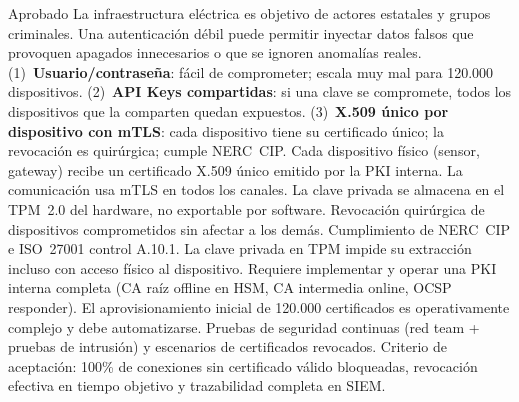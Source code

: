 \documentclass[12pt, letterpaper]{article}
\begin{document}
  {Aprobado}
  {La infraestructura eléctrica es objetivo de actores estatales y grupos criminales.
   Una autenticación débil puede permitir inyectar datos falsos que provoquen apagados
   innecesarios o que se ignoren anomalías reales.}
  {(1)~\textbf{Usuario/contraseña}: fácil de comprometer; escala muy mal para 120.000
   dispositivos.
   (2)~\textbf{API Keys compartidas}: si una clave se compromete, todos los dispositivos
   que la comparten quedan expuestos.
   (3)~\textbf{X.509 único por dispositivo con mTLS}: cada dispositivo tiene su
   certificado único; la revocación es quirúrgica; cumple NERC~CIP.}
  {Cada dispositivo físico (sensor, gateway) recibe un certificado X.509 único emitido
   por la PKI interna. La comunicación usa mTLS en todos los canales. La clave privada
   se almacena en el TPM~2.0 del hardware, no exportable por software.}
  {Revocación quirúrgica de dispositivos comprometidos sin afectar a los demás.
   Cumplimiento de NERC~CIP e ISO~27001 control A.10.1. La clave privada en TPM impide
   su extracción incluso con acceso físico al dispositivo.}
  {Requiere implementar y operar una PKI interna completa (CA raíz offline en HSM,
   CA intermedia online, OCSP responder). El aprovisionamiento inicial de 120.000
    certificados es operativamente complejo y debe automatizarse.}
    {Pruebas de seguridad continuas (red team + pruebas de intrusión) y escenarios de
    certificados revocados. Criterio de aceptación: 100\% de conexiones sin certificado
    válido bloqueadas, revocación efectiva en tiempo objetivo y trazabilidad completa
    en SIEM.}
\end{document}
